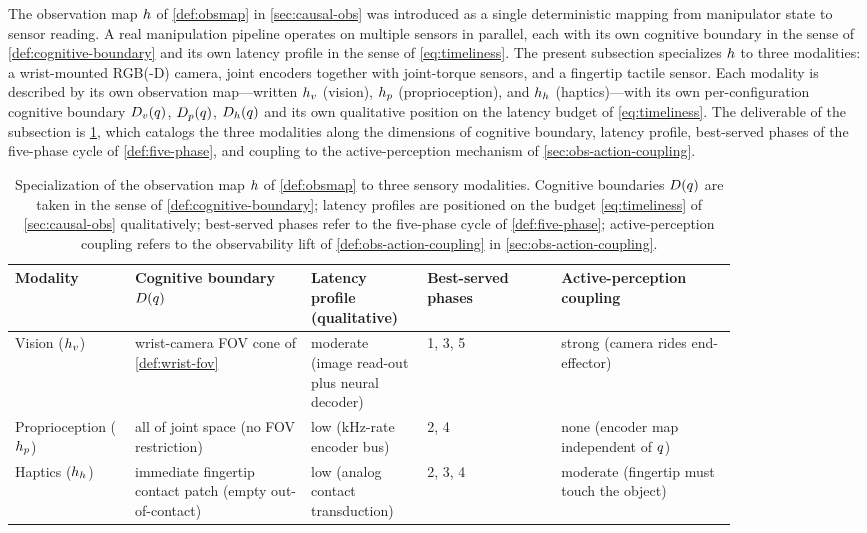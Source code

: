 The observation map $h$ of \cref{def:obsmap} in
\cref{sec:causal-obs} was introduced as a single deterministic
mapping from manipulator state to sensor reading. A real
manipulation pipeline operates on multiple sensors in parallel,
each with its own cognitive boundary in the sense of
\cref{def:cognitive-boundary} and its own latency profile in the
sense of \cref{eq:timeliness}. The present subsection
specializes $h$ to three modalities: a wrist-mounted
RGB(-D) camera, joint encoders together with joint-torque
sensors, and a fingertip tactile sensor. Each modality is
described by its own observation map---written
$h_{v}$ (vision), $h_{p}$ (proprioception), and
$h_{h}$ (haptics)---with its own per-configuration
cognitive boundary
$D_{v}(q)$, $D_{p}(q)$, $D_{h}(q)$ and
its own qualitative position on the latency budget of
\eqref{eq:timeliness}. The deliverable of the subsection is
\cref{tab:modality-comparison}, which catalogs the three
modalities along the dimensions of cognitive boundary, latency
profile, best-served phases of the five-phase cycle of
\cref{def:five-phase}, and coupling to the active-perception
mechanism of \cref{sec:obs-action-coupling}.

\begin{table}[h]
\centering
\small
\begin{tabular}{@{}p{0.13\linewidth}p{0.21\linewidth}p{0.13\linewidth}p{0.16\linewidth}p{0.21\linewidth}@{}}
\toprule
Modality & Cognitive boundary $D(q)$
         & Latency profile (qualitative)
         & Best-served phases
         & Active-perception coupling \\
\midrule
Vision ($h_{v}$)
  & wrist-camera FOV cone of \cref{def:wrist-fov}
  & moderate (image read-out plus neural decoder)
  & 1, 3, 5
  & strong (camera rides end-effector) \\
Proprioception ($h_{p}$)
  & all of joint space (no FOV restriction)
  & low (kHz-rate encoder bus)
  & 2, 4
  & none (encoder map independent of $q$) \\
Haptics ($h_{h}$)
  & immediate fingertip contact patch (empty out-of-contact)
  & low (analog contact transduction)
  & 2, 3, 4
  & moderate (fingertip must touch the object) \\
\bottomrule
\end{tabular}
\caption{Specialization of the observation map $h$ of
\cref{def:obsmap} to three sensory modalities. Cognitive
boundaries $D(q)$ are taken in the sense of
\cref{def:cognitive-boundary}; latency profiles are positioned on
the budget \eqref{eq:timeliness} of \cref{sec:causal-obs}
qualitatively; best-served phases refer to the five-phase
cycle of \cref{def:five-phase}; active-perception coupling refers
to the observability lift of \cref{def:obs-action-coupling} in
\cref{sec:obs-action-coupling}.}
\label{tab:modality-comparison}
\end{table}

